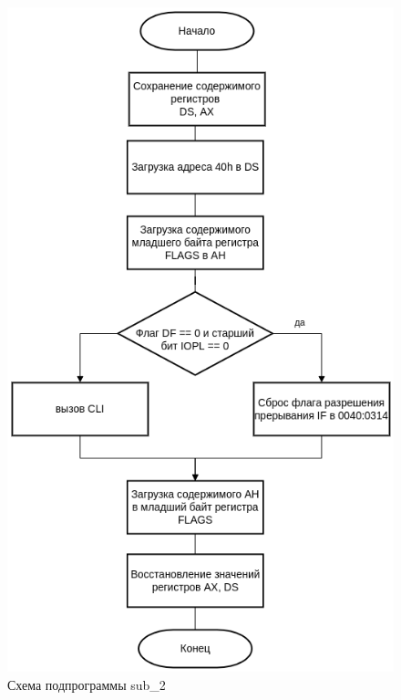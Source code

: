 \begin{figure}
	\begin{center}
		\includegraphics[scale=0.7]{img/sub_2}
	\end{center}
	\captionsetup{justification=centering}
	\caption{Схема подпрограммы sub\_2}
	\label{img:s1}
\end{figure}